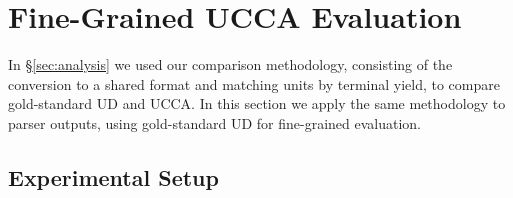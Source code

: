 \documentclass[11pt,a4paper]{article}
\begin{document}
\section{Fine-Grained UCCA Evaluation}\label{sec:fine_grained}

In \S\ref{sec:analysis} we used our comparison methodology,
consisting of the conversion to a shared format and matching units by terminal yield,
to compare gold-standard UD and UCCA.
In this section we apply the same methodology to parser outputs,
using gold-standard UD for fine-grained evaluation.

\subsection{Experimental Setup}\label{sec:experiments}

\end{document}
